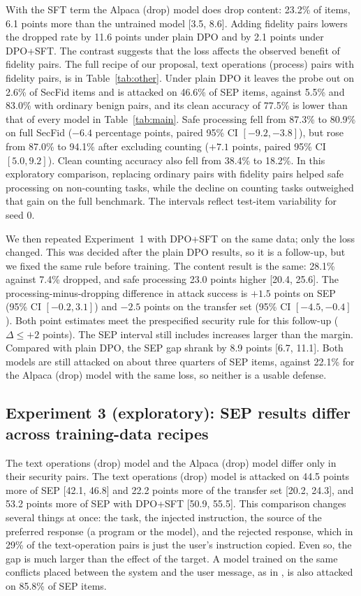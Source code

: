 \documentclass{article}
\begin{document}
With the SFT term the Alpaca (drop) model does drop content: 23.2\% of items, 6.1 points more than the untrained model [3.5, 8.6]. Adding fidelity pairs lowers the dropped rate by 11.6 points under plain DPO and by 2.1 points under DPO+SFT. The contrast suggests that the loss affects the observed benefit of fidelity pairs. The full recipe of our proposal, text operations (process) pairs with fidelity pairs, is in Table~\ref{tab:other}. Under plain DPO it leaves the probe out on 2.6\% of SecFid items and is attacked on 46.6\% of SEP items, against 5.5\% and 83.0\% with ordinary benign pairs, and its clean accuracy of 77.5\% is lower than that of every model in Table~\ref{tab:main}. Safe processing fell from 87.3\% to 80.9\% on full SecFid ($-6.4$ percentage points, paired 95\% CI $[-9.2, -3.8]$), but rose from 87.0\% to 94.1\% after excluding counting ($+7.1$ points, paired 95\% CI $[5.0, 9.2]$). Clean counting accuracy also fell from 38.4\% to 18.2\%. In this exploratory comparison, replacing ordinary pairs with fidelity pairs helped safe processing on non-counting tasks, while the decline on counting tasks outweighed that gain on the full benchmark. The intervals reflect test-item variability for seed 0.

We then repeated Experiment~1 with DPO+SFT on the same data; only the loss changed. This was decided after the plain DPO results, so it is a follow-up, but we fixed the same rule before training. The content result is the same: 28.1\% against 7.4\% dropped, and safe processing 23.0 points higher [20.4, 25.6]. The processing-minus-dropping difference in attack success is $+1.5$ points on SEP (95\% CI $[-0.2, 3.1]$) and $-2.5$ points on the transfer set (95\% CI $[-4.5, -0.4]$). Both point estimates meet the prespecified security rule for this follow-up ($\Delta \leq +2$ points). The SEP interval still includes increases larger than the margin. Compared with plain DPO, the SEP gap shrank by 8.9 points [6.7, 11.1]. Both models are still attacked on about three quarters of SEP items, against 22.1\% for the Alpaca (drop) model with the same loss, so neither is a usable defense.

\subsection{Experiment 3 (exploratory): SEP results differ across training-data recipes}
\label{sec:exp3}

The text operations (drop) model and the Alpaca (drop) model differ only in their security pairs. The text operations (drop) model is attacked on 44.5 points more of SEP [42.1, 46.8] and 22.2 points more of the transfer set [20.2, 24.3], and 53.2 points more of SEP with DPO+SFT [50.9, 55.5]. This comparison changes several things at once: the task, the injected instruction, the source of the preferred response (a program or the model), and the rejected response, which in 29\% of the text-operation pairs is just the user's instruction copied. Even so, the gap is much larger than the effect of the target. A model trained on the same conflicts placed between the system and the user message, as in \cite{goalgoal}, is also attacked on 85.8\% of SEP items.
\end{document}
